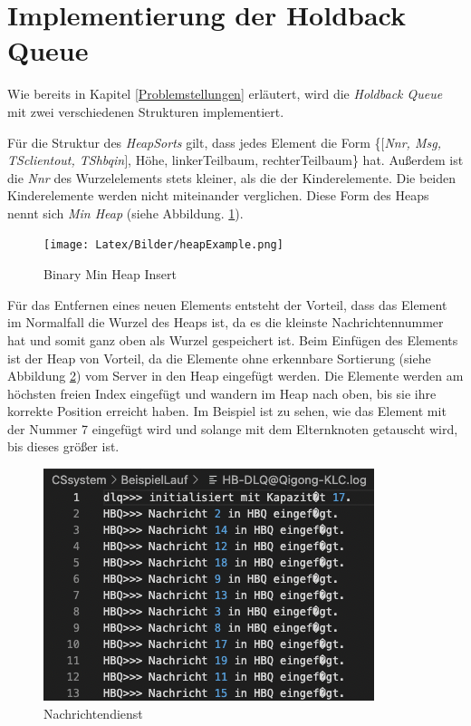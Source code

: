 \section{Implementierung der Holdback Queue}

Wie bereits in Kapitel \ref{Problemstellungen} erläutert, wird die \textit{Holdback Queue} mit zwei verschiedenen Strukturen implementiert.

Für die Struktur des \textit{HeapSorts} gilt, dass jedes Element die Form \{$[$\textit{Nnr, Msg, TSclientout, TShbqin}$]$, Höhe, linkerTeilbaum, rechterTeilbaum\} hat. Außerdem ist die \textit{Nnr} des Wurzelelements stets kleiner, als die der Kinderelemente. Die beiden Kinderelemente werden nicht miteinander verglichen. Diese Form des Heaps nennt sich \textit{Min Heap} (siehe Abbildung. \ref{fig:binHeap}).

\begin{figure}[htbp]
\begin{center}
\texttt{[image: Latex/Bilder/heapExample.png]}
\caption[Binary Min Heap Insert]{Binary Min Heap Insert\footnotemark}\label{fig:binHeap} 
\end{center}
\end{figure}

Für das Entfernen eines neuen Elements entsteht der Vorteil, dass das Element im Normalfall die Wurzel des Heaps ist, da es die kleinste Nachrichtennummer hat und somit ganz oben als Wurzel gespeichert ist. Beim Einfügen des Elements ist der Heap von Vorteil, da die Elemente ohne erkennbare Sortierung (siehe Abbildung \ref{fig:HBQFilesEntry}) vom Server in den Heap eingefügt werden. Die Elemente werden am höchsten freien Index eingefügt und wandern im Heap nach oben, bis sie ihre korrekte Position erreicht haben. Im Beispiel ist zu sehen, wie das Element mit der Nummer 7 eingefügt wird und solange mit dem Elternknoten getauscht wird, bis dieses größer ist. 

\begin{figure}[htbp]
\begin{center}
\includegraphics[scale=0.55]{Bilder/HBQFilesEntry.png}
\caption{\label{fig:HBQFilesEntry} Nachrichtendienst \cite{HBQlogging}} 
\end{center}
\end{figure}


